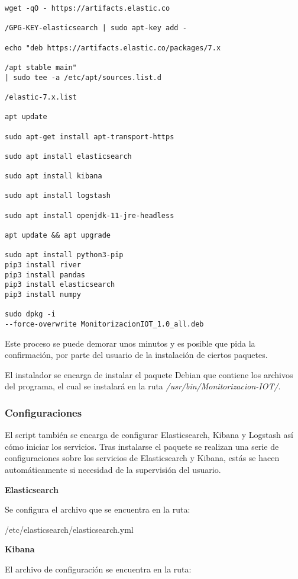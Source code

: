 \begin{lstlisting}[frame=single] 
wget -qO - https://artifacts.elastic.co

/GPG-KEY-elasticsearch | sudo apt-key add -

echo "deb https://artifacts.elastic.co/packages/7.x

/apt stable main" 
| sudo tee -a /etc/apt/sources.list.d

/elastic-7.x.list

apt update

sudo apt-get install apt-transport-https

sudo apt install elasticsearch

sudo apt install kibana

sudo apt install logstash

sudo apt install openjdk-11-jre-headless

apt update && apt upgrade

sudo apt install python3-pip
pip3 install river
pip3 install pandas
pip3 install elasticsearch
pip3 install numpy

sudo dpkg -i 
--force-overwrite MonitorizacionIOT_1.0_all.deb

\end{lstlisting}

Este proceso se puede demorar unos minutos y es posible que pida la confirmación, por parte del usuario de la instalación de ciertos paquetes.

El instalador se encarga de instalar el paquete Debian que contiene los archivos del programa, el cual se instalará en la ruta \textit{/usr/bin/Monitorizacion-IOT/}. 

\subsubsection{Configuraciones}

El script también se encarga de configurar Elasticsearch, Kibana y Logstash así cómo iniciar los servicios.
Tras instalarse el paquete se realizan una serie de configuraciones sobre los servicios de Elasticsearch y Kibana, estás se hacen automáticamente si necesidad de la supervisión del usuario.

\textbf{Elasticsearch}

Se configura el archivo que se encuentra en la ruta:

/etc/elasticsearch/elasticsearch.yml

\textbf{Kibana}

El archivo de configuración se encuentra en la ruta:

